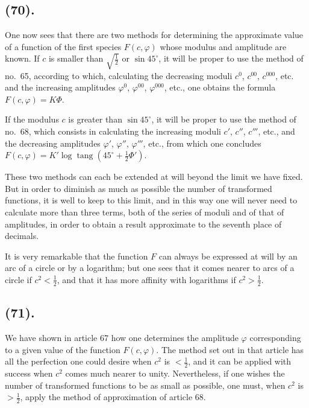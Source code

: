 \documentclass{article}
\begin{document}
\subsection*{(70).}

One now sees that there are two methods for determining the approximate value of a function of the first species $F(c,\varphi)$ whose modulus and amplitude are known. If $c$ is smaller than $\sqrt{\frac{1}{2}}$ or $\sin45^{\circ}$, it will be proper to use the method of no.~65, according to which, calculating the decreasing moduli $c^{0}$, $c^{00}$, $c^{000}$, etc. and the increasing amplitudes $\varphi^{0}$, $\varphi^{00}$, $\varphi^{000}$, etc., one obtains the formula $F(c,\varphi)=K\Phi$.

If the modulus $c$ is greater than $\sin45^{\circ}$, it will be proper to use the method of no.~68, which consists in calculating the increasing moduli $c'$, $c''$, $c'''$, etc., and the decreasing amplitudes $\varphi'$, $\varphi''$, $\varphi'''$, etc., from which one concludes $F(c,\varphi)=K'\log\operatorname{tang}(45^{\circ}+\frac{1}{2}\Phi')$.

These two methods can each be extended at will beyond the limit we have fixed. But in order to diminish as much as possible the number of transformed functions, it is well to keep to this limit, and in this way one will never need to calculate more than three terms, both of the series of moduli and of that of amplitudes, in order to obtain a result approximate to the seventh place of decimals.

It is very remarkable that the function $F$ can always be expressed at will by an arc of a circle or by a logarithm; but one sees that it comes nearer to arcs of a circle if $c^{2}<\frac{1}{2}$, and that it has more affinity with logarithms if $c^{2}>\frac{1}{2}$.

\subsection*{(71).}

We have shown in article 67 how one determines the amplitude $\varphi$ corresponding to a given value of the function $F(c,\varphi)$. The method set out in that article has all the perfection one could desire when $c^{2}$ is $<\frac{1}{2}$, and it can be applied with success when $c^{2}$ comes much nearer to unity. Nevertheless, if one wishes the number of transformed functions to be as small as possible, one must, when $c^{2}$ is $>\frac{1}{2}$, apply the method of approximation of article 68.
\end{document}
